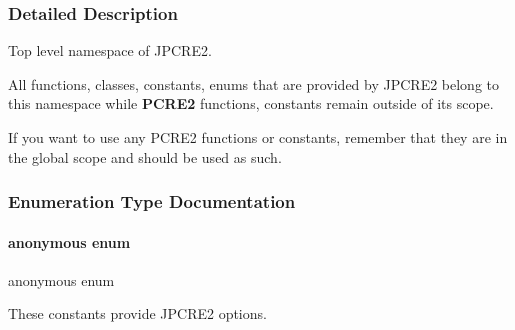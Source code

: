 \subsubsection{Detailed Description}
Top level namespace of J\+P\+C\+R\+E2. 

All functions, classes, constants, enums that are provided by J\+P\+C\+R\+E2 belong to this namespace while {\bfseries P\+C\+R\+E2} functions, constants remain outside of its scope.

If you want to use any P\+C\+R\+E2 functions or constants, remember that they are in the global scope and should be used as such. 

\subsubsection{Enumeration Type Documentation}
\hypertarget{namespacejpcre2_a85c143271501e383843f45b9999c2f00_a85c143271501e383843f45b9999c2f00}{}\label{namespacejpcre2_a85c143271501e383843f45b9999c2f00_a85c143271501e383843f45b9999c2f00} 
\paragraph{\texorpdfstring{anonymous enum}{anonymous enum}}
{\footnotesize\ttfamily anonymous enum}



These constants provide J\+P\+C\+R\+E2 options. 

